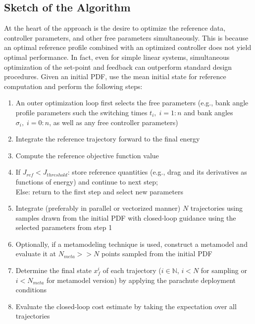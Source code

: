 \documentclass[10pt,a4paper]{article}
\begin{document}
	\subsection{Sketch of the Algorithm}
	At the heart of the approach is the desire to optimize the reference data, controller parameters, and other free parameters simultaneously. This is because an optimal reference profile combined with an optimized controller does not yield optimal performance. In fact, even for simple linear systems, simultaneous optimization of the set-point and feedback can outperform standard design procedures\cite{Boyd}. Given an initial PDF, use the mean initial state for reference computation and perform the following steps:
	\begin{enumerate}
		\item An outer optimization loop first selects the free parameters (e.g., bank angle profile parameters such the switching times $t_i,\;i=1:n$ and bank angles $\sigma_i,\;i=0:n$, as well as any free controller parameters)
		\item Integrate the reference trajectory forward to the final energy
		\item Compute the reference objective function value
		\item If $ J_{ref} < J_{threshold} $: store reference quantities (e.g., drag and its derivatives as functions of energy) and continue to next step;\\
		Else: return to the first step and select new parameters
		\item Integrate (preferably in parallel or vectorized manner) $ N $ trajectories using samples drawn from the initial PDF with closed-loop guidance using the selected parameters from step 1
		\item Optionally, if a metamodeling technique is used, construct a metamodel and evaluate it at $N_{meta}>> N$ points sampled from the initial PDF
		\item Determine the final state $x^i_{f}$ of each trajectory ($i\in \mathbb{N}$, $i<N$ for sampling or $i < N_{meta}$ for metamodel version) by applying the parachute deployment conditions
		\item Evaluate the closed-loop cost estimate by taking the expectation over all trajectories
	\end{enumerate}
		
\end{document}
